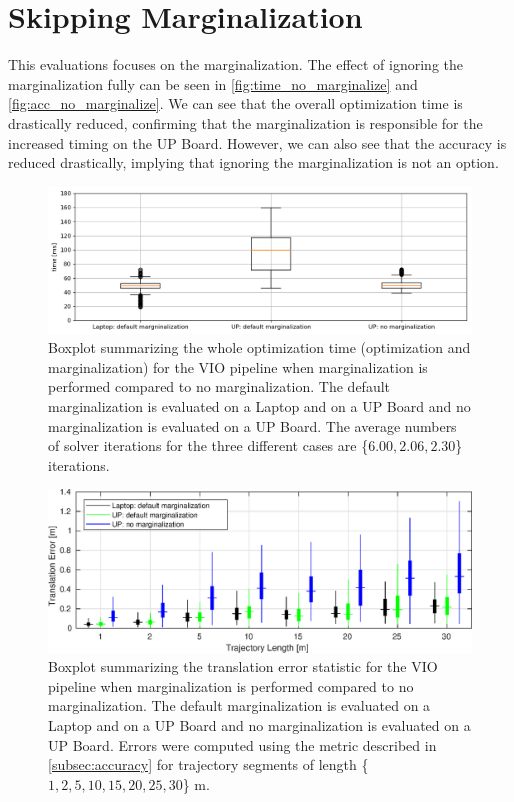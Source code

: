 \section{Skipping Marginalization} \label{sec:dontMarginalize}
This evaluations focuses on the marginalization. The effect of ignoring the 
marginalization fully can be seen in \autoref{fig:time_no_marginalize} and 
\autoref{fig:acc_no_marginalize}. We can see that the overall optimization 
time is drastically reduced, confirming that the marginalization is responsible 
 for the increased timing on the UP Board. However, we can also see that the 
accuracy is reduced drastically, implying that ignoring the marginalization is 
not an option. 
\begin{figure}[H]
\centering
\includegraphics[width=1\textwidth]{images/time_no_marginalize}
\caption{Boxplot summarizing the whole optimization time (optimization and 
marginalization) for the \ac{VIO} pipeline when marginalization is performed 
compared to no marginalization. The default marginalization is evaluated on a 
Laptop and on a UP Board and no marginalization is evaluated on a UP Board. The 
average numbers of solver iterations for the three different cases are \{$6.00, 
2.06, 2.30$\} iterations.}
\label{fig:time_no_marginalize}
\end{figure}
\begin{figure}[H]
\centering
\includegraphics[width=1\textwidth]{images/acc_no_marginalize}
\caption{Boxplot summarizing the translation error statistic for the \ac{VIO}
pipeline when marginalization is performed compared to no marginalization. The 
default marginalization is evaluated on a Laptop and on a UP Board and no 
marginalization is evaluated on a UP Board. Errors were computed using the 
metric described in \autoref{subsec:accuracy} for trajectory segments of length 
\{$1, 2, 5, 10, 15, 20, 25, 30$\} m.}
\label{fig:acc_no_marginalize}
\end{figure}


